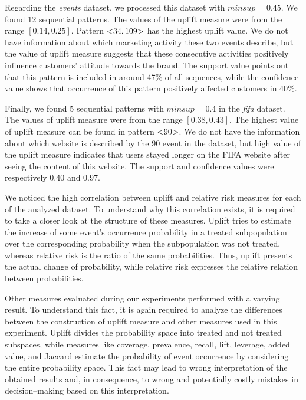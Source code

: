 \documentclass[runningheads,a4paper]{llncs}
\begin{document}
Regarding the \textit{events} dataset, we processed this dataset with $\textit{minsup} = 0.45$.
We found 12 sequential patterns.
The values of the uplift measure were from the range $[0.14, 0.25]$.
Pattern $\text{\textless} 34, 109\text{\textgreater}$ has the highest uplift value.
We do not have information about which marketing activity these two events describe, but the value of uplift measure suggests that these consecutive activities positively influence customers’ attitude towards the brand.
The support value points out that this pattern is included in around 47\% of all sequences, while the confidence value shows that occurrence of this pattern positively affected customers in 40\%.

Finally, we found 5 sequential patterns with $\textit{minsup}=0.4$ in the \textit{fifa} dataset.
The values of uplift measure were from the range $[0.38, 0.43]$.
The highest value of uplift measure can be found in pattern $\text{\textless} 90\text{\textgreater}$.
We do not have the information about which website is described by the $90$ event in the dataset, but high value of the uplift measure indicates that users stayed longer on the FIFA website after seeing the content of this website.
The support and confidence values were respectively 0.40 and 0.97.

We noticed the high correlation between uplift and relative risk measures for each of the analyzed dataset.
To understand why this correlation exists, it is required to take a closer look at the structure of these measures.
Uplift tries to estimate the increase of some event's occurrence probability in a treated subpopulation over the corresponding probability when the subpopulation was not treated, whereas relative risk is the ratio of the same probabilities.
Thus, uplift presents the actual change of probability, while relative risk expresses the relative relation between probabilities.

Other measures evaluated during our experiments performed with a varying result.
To understand this fact, it is again required to analyze the differences between the construction of uplift measure and other measures used in this experiment.
Uplift divides the probability space into treated and not treated subspaces, while measures like coverage, prevalence, recall, lift, leverage, added value, and Jaccard estimate the probability of event occurrence by considering the entire probability space.
This fact may lead to wrong interpretation of the obtained results and, in consequence, to wrong and potentially costly mistakes in decision--making based on this interpretation.
\end{document}

